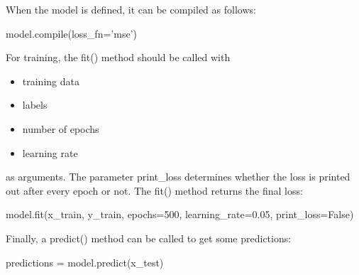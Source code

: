 \documentclass{article}
\begin{document}
When the model is defined, it can be compiled as follows:
\begin{python}
model.compile(loss_fn='mse')
\end{python}

For training, the fit() method should be called with 
\begin{itemize}
    \item training data
    \item labels 
    \item number of epochs
    \item learning rate
\end{itemize}
as arguments. The parameter print\_loss determines whether the loss is printed out 
after every epoch or not. The fit() method returns the final loss:
\begin{python}
model.fit(x_train,
          y_train,
          epochs=500,
          learning_rate=0.05,
          print_loss=False)
\end{python}
Finally, a predict() method can be called to get some predictions:
\begin{python}
predictions = model.predict(x_test)
\end{python}
    \clearpage
\end{document}
